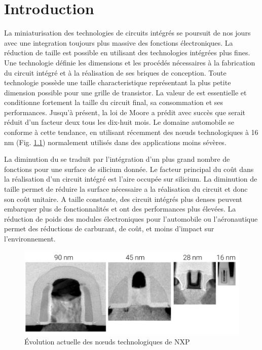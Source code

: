 \chapter{Introduction}

La miniaturisation des technologies de circuits intégrés se poursuit de nos jours avec une integration toujours plus massive des fonctions électroniques.
La réduction de taille est possible en utilisant des technologies intégrées plus fines.
Une technologie définie les dimensions et les procédés nécessaires à la fabrication du circuit intégré et à la réalisation de ses briques de conception.
Toute technologie possède une taille characteristique \textlambda{} représentant la plus petite dimension possible pour une grille de transistor.
La valeur de \textlambda{} est essentielle et conditionne fortement la taille du circuit final, sa consommation et ses performances.
Jusqu'à présent, la loi de Moore a prédit avec succès que \textlambda{} serait réduit d'un facteur deux tous les dix-huit mois.
Le domaine automobile se conforme à cette tendance, en utilisant récemment des nœuds technologiques à 16 nm (Fig. \ref{fig:nxp-techno-increase}) \cite{evolution_technologies} normalement utilisés dans des applications moins sévères.

La diminution du \textlambda{} se traduit par l'intégration d'un plus grand nombre de fonctions pour une surface de silicium donnée.
Le facteur principal du coût dans la réalisation d'un circuit intégré est l'aire occupée sur silicium.
La diminution de taille permet de réduire la surface nécessaire a la réalisation du circuit et donc son coût unitaire.
A taille constante, des circuit intégrés plus denses peuvent embarquer plus de fonctionnalités et ont des performances plus élevées.
La réduction de poids des modules électroniques pour l'automobile ou l'aéronautique permet des réductions de carburant, de coût, et moins d'impact sur l'environnement.

\begin{figure}[!h]
  \centering
  \includegraphics[width=\textwidth]{src/1/figures/technology_evolution.pdf}
  \caption{Évolution actuelle des nœuds technologiques de NXP \cite{evolution_technologies}}
  \label{fig:nxp-techno-increase}
\end{figure}

